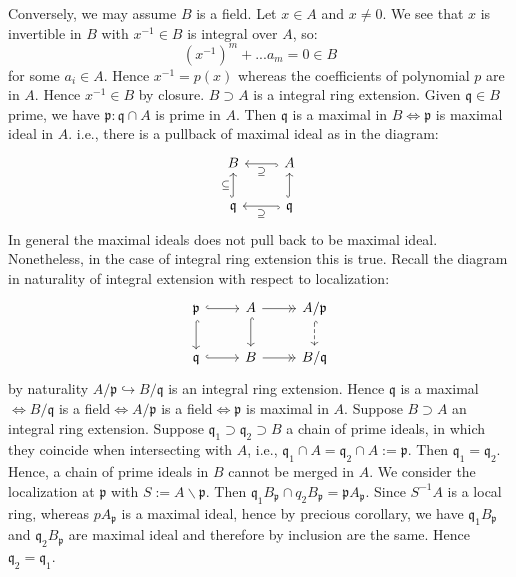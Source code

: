 \documentclass[12pt]{article}
\theoremstyle{definition}
\theoremstyle{plain}
\newcommand{\inj}{\hookrightarrow}
\begin{document}
\medskip
Conversely, we may assume $B$ is a field. Let $x\in A$ and $x\neq 0$. We see that $x$ is invertible in $B$ with $x^{-1}\in B$ is integral over $A$, so:
\[(x^{-1})^m+...a_m=0\in B\]
for some $a_i\in A$. Hence $x^{-1}=p(x)$ whereas the coefficients of polynomial $p$ are in $A$. Hence $x^{-1}\in B$ by closure.
\Cor $B\supset A$ is a integral ring extension. Given $\mathfrak{q}\in B$ prime, we have $\mathfrak{p}:\mathfrak{q}\cap A$ is prime in $A$. Then $\mathfrak{q}$ is a maximal in $B\iff\mathfrak{p}$ is maximal ideal in $A$. i.e., there is a pullback of maximal ideal as in the diagram:
\begin{equation}
  \begin{tikzcd}
    B &A\ar[hook]{l}{\supseteq}\\
    \mathfrak{q}\ar[hook]{u}{\subseteq} &\mathfrak{q}\ar[hook]{u}\ar[hook]{l}{\supseteq}
  \end{tikzcd}
\end{equation}
\Rmk In general the maximal ideals does not pull back to be maximal ideal. Nonetheless, in the case of integral ring extension this is true.
\proof Recall the diagram in naturality of integral extension with respect to localization:
\begin{equation}
\begin{tikzcd}
\mathfrak{p}\ar[hook]{r}\ar[hook]{d}&A\ar[hook]{d}\ar[->>]{r}&A/\mathfrak{p}\ar[hook, dashed]{d}\\
\mathfrak{q}\ar[hook]{r}&B\ar[->>]{r} &B/\mathfrak{q}
\end{tikzcd}
\end{equation}
 by naturality $A/\mathfrak{p}\inj B/\mathfrak{q}$ is an integral ring extension. Hence $\mathfrak{q}$ is a maximal$\iff B/\mathfrak{q}$ is a field$\iff A/\mathfrak{p}$ is a field$\iff \mathfrak{p}$ is maximal in $A$.\qedhere
\Cor Suppose $B\supset A$ an integral ring extension. Suppose $\mathfrak{q}_1\supset \mathfrak{q}_2\supset B$ a chain of prime ideals, in which they coincide when intersecting with $A$, i.e., $\mathfrak{q}_1\cap A=\mathfrak{q}_2\cap A:=\mathfrak{p}$. Then $\mathfrak{q}_1=\mathfrak{q}_2$. Hence, a chain of prime ideals in $B$ cannot be merged in $A$.
\proof We consider the localization at $\mathfrak{p}$ with $S:=A\backslash \mathfrak{p}$. Then $\mathfrak{q}_1B_\mathfrak{p}\cap q_2B_\mathfrak{p}=\mathfrak{p}A_\mathfrak{p}$. Since $S^{-1}A$ is a local ring, whereas $pA_\mathfrak{p}$ is a maximal ideal, hence by precious corollary, we have $\mathfrak{q}_1B_\mathfrak{p}$ and $\mathfrak{q}_2B_\mathfrak{p}$ are maximal ideal and therefore by inclusion are the same. Hence $\mathfrak{q}_2=\mathfrak{q}_1$.
\end{document}

